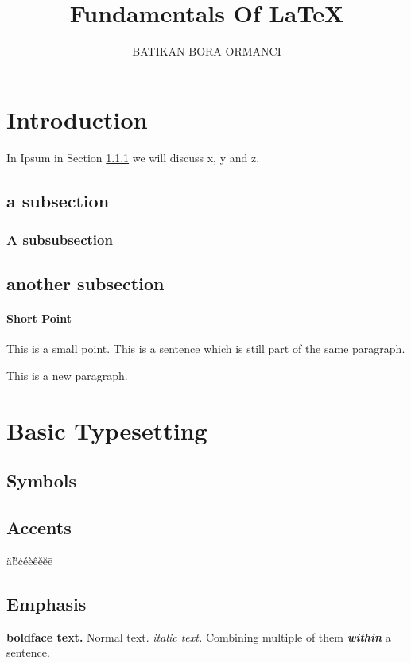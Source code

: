 \documentclass[a4paper, twocolumn]{article}
\title{Fundamentals Of \LaTeX}
\author{BATIKAN BORA ORMANCI}
\begin{document}
	\maketitle	
	
	\begin{abstract}
		\lipsum[1]
	\end{abstract}
	
	\tableofcontents
	
	\section{Introduction}
	In Ipsum in Section \ref{sec:ipsum} we will discuss x, y and z. 
	\subsection{a subsection}
	\lipsum
	\subsubsection{A subsubsection}\label{sec:ipsum}
	
	\subsection{another subsection}
	\lipsum[1]
	
	\paragraph{Short Point}
	This is a small point. This is 
	a sentence which is still part of the same paragraph. 
	
	This is a new paragraph. 
	
	\section{Basic Typesetting}
	\subsection{Symbols}
	\EUR \EURhv
	
	\subsection{Accents}
	\"{a}\H{b}\.{c}\'{e}\`{e}\^{e}\v{e}\u{e}\={e}
	
	\subsection{Emphasis}
	\textbf{boldface text.}
	Normal text.
	\textit{italic text.}
	Combining multiple of them \textbf{\textit{within}} a sentence. 
	
\end{document}
